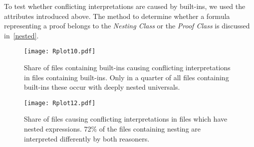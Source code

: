 To test whether conflicting interpretations are caused by built-ins, we used the attributes introduced above. 
The method to determine whether a formula representing a proof belongs to the \emph{Nesting Class} or the \emph{Proof Class}  is discussed in~\ref{nested}. 

\begin{figure}
 \texttt{[image: Rplot10.pdf]}
 \caption{Share of files containing built-ins causing conflicting interpretations in
 files containing built-ins. Only in a quarter of all files containing built-ins 
 these occur with deeply nested universals.
\label{builtins}}
\end{figure} 
\begin{figure}
 \texttt{[image: Rplot12.pdf]}
 \caption{Share of files causing conflicting interpretations in
 files which have nested expressions. 72\% of the files containing nesting are interpreted differently by both reasoners.
\label{onlynests}}
\end{figure}

% 


